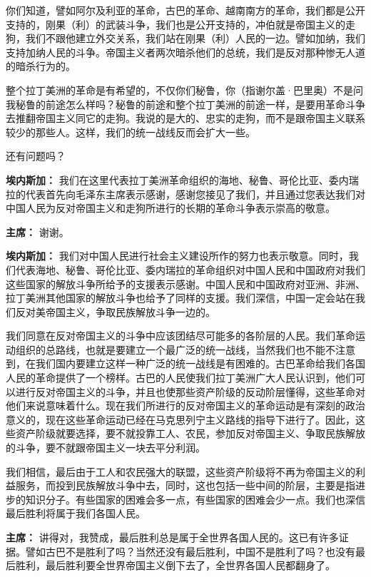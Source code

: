 \begin{duihua}
你们知道，譬如阿尔及利亚的革命，古巴的革命、越南南方的革命，我们都是公开支持的，刚果（利）的武装斗争，我们也是公开支持的，冲伯就是帝国主义的走狗，我们不跟他建立外交关系，我们站在刚果（利）人民的一边。譬如加纳，我们支持加纳人民的斗争。帝国主义者两次暗杀他们的总统，我们是反对那种惨无人道的暗杀行为的。

整个拉丁美洲的革命是有希望的，不仅你们秘鲁，你（指谢尔盖·巴里奥）不是问我秘鲁的前途怎么样吗？秘鲁的前途和整个拉丁美洲的前途一样，是要用革命斗争去推翻帝国主义同它的走狗。我说的是大的、忠实的走狗，而不是跟帝国主义联系较少的那些人。这样，我们的统一战线反而会扩大一些。

还有问题吗？

\item[\textbf{埃内斯加：}] 我们在这里代表拉丁美洲革命组织的海地、秘鲁、哥伦比亚、委内瑞拉的代表首先向毛泽东主席表示感谢，感谢您接见了我们，并且通过您表达我们对中国人民为反对帝国主义和走狗所进行的长期的革命斗争表示崇高的敬意。

\item[\textbf{主席：}] 谢谢。

\item[\textbf{埃内斯加：}] 我们对中国人民进行社会主义建设所作的努力也表示敬意。同时，我们代表海地、秘鲁、哥伦比亚、委内瑞拉的革命组织对中国人民和中国政府对我们这些国家的解放斗争所给予的支援表示感谢。中国人民和中国政府对亚洲、非洲、拉丁美洲其他国家的解放斗争也给予了同样的支援。我们深信，中国一定会站在我们反对美帝国主义，争取民族解放斗争一边的。

我们同意在反对帝国主义的斗争中应该团结尽可能多的各阶层的人民。我们革命运动组织的总路线，也就是要建立一个最广泛的统一战线，当然我们也不能不注意到，在我们国内要建立这样一种广泛的统一战线是有困难的。古巴革命给我们各国人民的革命提供了一个榜样。古巴的人民使我们拉丁美洲广大人民认识到，他们可以进行反对帝国主义的斗争，并且也使那些资产阶级的反动阶层懂得，这些革命对他们来说意味着什么。现在我们所进行的反对帝国主义的革命运动是有深刻的政治意义的，现在这些革命运动已经在马克思列宁主义路线的指导下进行了。因此，这些资产阶级就要选择，要不就投靠工人、农民，参加反对帝国主义、争取民族解放的斗争，要不就跟帝国主义一块去平分利润。

我们相信，最后由于工人和农民强大的联盟，这些资产阶级将不再为帝国主义的利益服务，而投到民族解放斗争中去，同时，这也包括一些中间的阶层，主要是指进步的知识分子。有些国家的困难会多一点，有些国家的困难会少一点。我们也深信最后胜利将属于我们各国人民。

\item[\textbf{主席：}] 讲得对，我赞成，最后胜利总是属于全世界各国人民的。这已有许多证据。譬如古巴不是胜利了吗？当然还没有最后胜利，中国不是胜利了吗？也没有最后胜利，最后胜利要全世界帝国主义倒下去了，全世界各国人民都翻身了。


\end{duihua}

